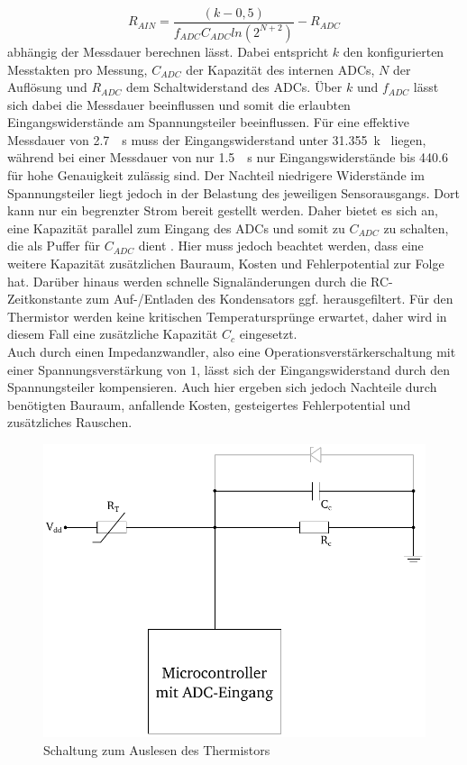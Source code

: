 \begin{equation} \label{eq:ADC}
R_{AIN} = \frac{(k-0,5)}{f_{ADC} C_{ADC} ln(2^{N+2})} - R_{ADC}
\end{equation}
abhängig der Messdauer berechnen lässt. Dabei entspricht $k$ den konfigurierten Messtakten pro Messung, $C_{ADC}$ der Kapazität des internen ADCs, $N$ der Auflösung und $R_{ADC}$ dem Schaltwiderstand des ADCs. Über $k$ und $f_{ADC}$ lässt sich dabei die Messdauer beeinflussen und somit die erlaubten Eingangswiderstände am Spannungsteiler beeinflussen. Für eine effektive Messdauer von \SI{2,7}{\mu s} muss der Eingangswiderstand unter \SI{31,355}{k\Omega} liegen, während bei einer Messdauer von nur \SI{1,5}{\mu s} nur Eingangswiderstände bis \SI{440,6}{\Omega} für hohe Genauigkeit zulässig sind. Der Nachteil niedrigere Widerstände im Spannungsteiler liegt jedoch in der Belastung des jeweiligen Sensorausgangs. Dort kann nur ein begrenzter Strom bereit gestellt werden. Daher bietet es sich an, eine Kapazität parallel zum Eingang des ADCs und somit zu $C_{ADC}$ zu schalten, die als Puffer für $C_{ADC}$ dient \cite{ADC}. Hier muss jedoch beachtet werden, dass eine weitere Kapazität zusätzlichen Bauraum, Kosten und Fehlerpotential zur Folge hat. Darüber hinaus werden schnelle Signaländerungen durch die RC-Zeitkonstante zum Auf-/Entladen des Kondensators ggf. herausgefiltert. Für den Thermistor werden keine kritischen Temperatursprünge erwartet, daher wird in diesem Fall eine zusätzliche Kapazität $C_c$ eingesetzt.\\
Auch durch einen Impedanzwandler, also eine Operationsverstärkerschaltung mit einer Spannungsverstärkung von $1$, lässt sich der Eingangswiderstand durch den Spannungsteiler kompensieren. Auch hier ergeben sich jedoch Nachteile durch benötigten Bauraum, anfallende Kosten, gesteigertes Fehlerpotential und zusätzliches Rauschen.\\
\begin{figure}[H]
	\centering
	\includegraphics[width=0.5\linewidth]{./Bilder/fig_ther_elek}
	\caption{Schaltung zum Auslesen des Thermistors}
	\label{fig_ther_elek}
\end{figure}\noindent
